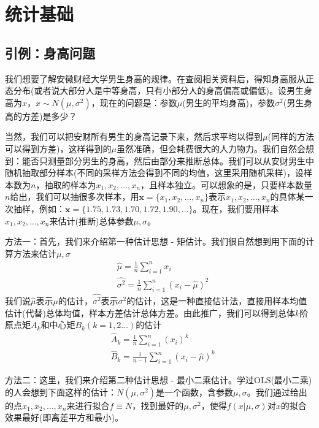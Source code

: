 % 
\chapter{统计基础}

\section{引例：身高问题}
    \par
    我们想要了解安徽财经大学男生身高的规律。在查阅相关资料后，得知身高服从正态分布(或者说大部分人是中等身高，只有小部分人的身高偏高或偏低)。设男生身高为$x$，$x \sim N(\mu,\sigma^2)$，现在的问题是：参数$\mu$(男生的平均身高)，参数$\sigma^2$(男生身高的方差)是多少？
    \par
    当然，我们可以把安财所有男生的身高记录下来，然后求平均以得到$\mu$(同样的方法可以得到方差)，这样得到的$\mu$虽然准确，但会耗费很大的人力物力。我们自然会想到：能否只测量部分男生的身高，然后由部分来推断总体。我们可以从安财男生中随机抽取部分样本(不同的采样方法会得到不同的均值，这里采用随机采样)，设样本数为$n$，抽取的样本为$x_1,x_2,\dots,x_n$，且样本独立。可以想象的是，只要样本数量$n$给出，我们可以抽很多次样本，用$\mathbf{x} = \{x_1,x_2,\dots,x_n\}$表示$x_1,x_2,\dots,x_n$的具体某一次抽样，例如：$\mathbf{x} = \{1.75,1.73,1.70,1.72,1.90,\dots\}$。现在，我们要用样本$x_1,x_2,\dots,x_n$来估计(推断)总体参数$\mu,\sigma$。
    \par
    方法一：首先，我们来介绍第一种估计思想 - 矩估计。我们很自然想到用下面的计算方法来估计$\mu,\sigma$
    \begin{align*}
      &\hat{\mu} = \frac{1}{n}\sum_{i = 1}^n x_i\\
      &\hat{\sigma^2} = \frac{1}{n}\sum_{i = 1}^n (x_i - \hat{\mu})^2
    \end{align*}
    我们说$\hat{\mu}$表示$\mu$的估计，$\hat{\sigma^2}$表示$\sigma^2$的估计，这是一种直接估计法，直接用样本均值估计(代替)总体均值，样本方差估计总体方差。由此推广，我们可以得到总体$k$阶原点矩$A_k$和中心矩$B_k(k = 1,2\dots)$的估计
    \begin{align*}
    &\hat{A}_k = \frac{1}{n} \sum_{i = 1}^n (x_i)^k\\
    &\hat{B}_k = \frac{1}{n-1} \sum_{i = 1}^n (x_i - \hat{\mu})^k
    \end{align*}
    \par
    方法二：这里，我们来介绍第二种估计思想 - 最小二乘估计。学过OLS(最小二乘)的人会想到下面这样的估计：$N(\mu,\sigma^2)$是一个函数，含参数$\mu,\sigma$。我们通过给出的点$x_1,x_2,\dots,x_n$来进行拟合$f\equiv N$，找到最好的$\mu,\sigma^2$，使得$f(x|\mu,\sigma)$对$x$的拟合效果最好(即离差平方和最小)。
